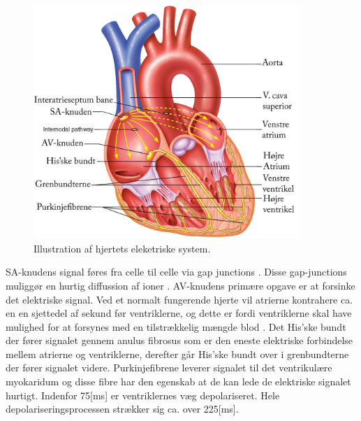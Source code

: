 \begin{figure}[H] %
\begin{center}
\includegraphics[width=0.9\textwidth]{figures/hjertet_elektriske.png}
\end{center}
\caption{Illustration af hjertets eleketriske system\cite{cindy}.}
\label{fig:hjerte_elektriske}
\end{figure}
\newpage
\noindent SA-knudens signal føres fra celle til celle via gap junctions \cite{gronanatomi}. Disse gap-junctions muliggør en hurtig diffussion af ioner \cite{guyton}. AV-knudens primære opgave er at  forsinke det elektriske signal. Ved et normalt fungerende hjerte vil atrierne kontrahere ca. en en sjettedel af sekund før ventriklerne, og dette er fordi ventriklerne skal have mulighed for at forsynes med en tilstrækkelig mængde blod \cite{guyton}. Det His'ske bundt der fører signalet gennem anulus fibrosus som er den eneste elektriske forbindelse mellem atrierne og ventriklerne, derefter går His'ske bundt over i grenbundterne der fører signalet videre. Purkinjefibrene leverer signalet til det ventrikulære myokaridum og disse fibre har den egenskab at de kan lede de elektriske signalet hurtigt. Indenfor 75[ms] er ventriklernes væg depolariseret. Hele depolariseringsprocessen strækker sig ca. over 225[ms]\cite{gronanatomi}.



